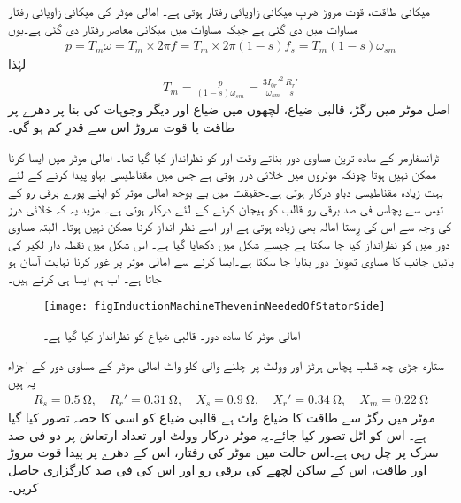 میکانی طاقت، قوت مروڑ ضربِ میکانی زاویائی رفتار ہوتی ہے۔ امالی موٹر کی میکانی زاویائی رفتار مساوات   میں دی گئی ہے جبکہ مساوات   میں میکانی معاصر رفتار  دی گئی ہے۔یوں
\begin{align}\label{مساوات_امالی_تین_دور_میکانی_طاقت_اور_رفتار}
p= T_m \omega =T_m \times 2 \pi f=T_m \times 2 \pi (1-s) f_s=T_m (1-s) \omega_{sm} 
\end{align}
لہٰذا
\begin{align}\label{مساوات_امالی_مروڑ_الف}
T_m=\frac{p}{(1-s) \omega_{sm}}=\frac{3 I_{0r}'^2}{\omega_{sm}} \frac{R_r'}{s}
\end{align}
اصل موٹر میں رگڑ، قالبی ضیاع، لچھوں میں ضیاع اور دیگر وجوہات کی بنا پر دھرے پر طاقت یا قوت مروڑ اس سے قدرِ کم ہو گی۔

ٹرانسفارمر کے سادہ ترین مساوی دور بناتے وقت  اور  کو نظرانداز کیا گیا تھا۔ امالی موٹر میں ایسا کرنا ممکن نہیں ہوتا چونکہ موٹروں میں خلائی درز ہوتی ہے جس میں مقناطیسی بہاو پیدا کرنے کے لئے بہت زیادہ مقناطیسی دباو درکار ہوتی ہے۔حقیقت میں بے بوجھ امالی موٹر کو اپنے پورے برقی رو کے تیس سے پچاس فی صد برقی رو قالب کو ہیجان کرنے کے لئے درکار ہوتی ہے۔ مزید یہ کہ خلائی درز کی وجہ سے اس کی رِستا امالہ بھی زیادہ ہوتی ہے اور اسے نظر انداز کرنا ممکن نہیں ہوتا۔ البتہ مساوی دور میں  کو نظرانداز کیا جا سکتا ہے جیسے شکل  میں دکھایا گیا ہے۔ اس شکل میں نقطہ دار لکیر کی بائیں جانب کا مساوی تھوِنن دور بنایا جا سکتا ہے۔ایسا کرنے سے امالی موٹر پر غور کرنا نہایت آسان ہو جاتا ہے۔ اب ہم ایسا ہی کرتے ہیں۔
\begin{figure}
\centering
\texttt{[image: figInductionMachineTheveninNeededOfStatorSide]}
\caption{امالی موٹر کا سادہ دور۔ قالبی ضیاع کو نظرانداز کیا گیا ہے۔}
\label{شکل_امالی_ساکن_حصے_کا_تھونن_دور}
\end{figure}
%
ستارہ جڑی چھ قطب پچاس ہرٹز اور   وولٹ پر چلنے والی   کلو واٹ امالی موٹر کے مساوی دور کے اجزاء یہ ہیں
\begin{align*}
R_s= \SI{0.5}{\ohm}, \quad R_r'=\SI{0.31}{\ohm}, \quad X_s=\SI{0.9}{\ohm}, \quad X_r'=\SI{0.34}{\ohm}, \quad X_m=\SI{0.22}{\ohm} 
\end{align*}
موٹر میں رگڑ سے طاقت کا ضیاع   واٹ ہے۔قالبی ضیاع کو اسی کا حصہ تصور کیا گیا ہے۔ اس کو اٹل تصور کیا جائے۔یہ موٹر درکار وولٹ اور تعداد ارتعاش پر دو فی صد سرک پر چل رہی ہے۔اس حالت میں موٹر کی رفتار، اس کے دھرے پر پیدا قوت مروڑ اور طاقت، اس کے ساکن لچھے کی برقی رو اور اس کی فی صد کارگزاری حاصل کریں۔

